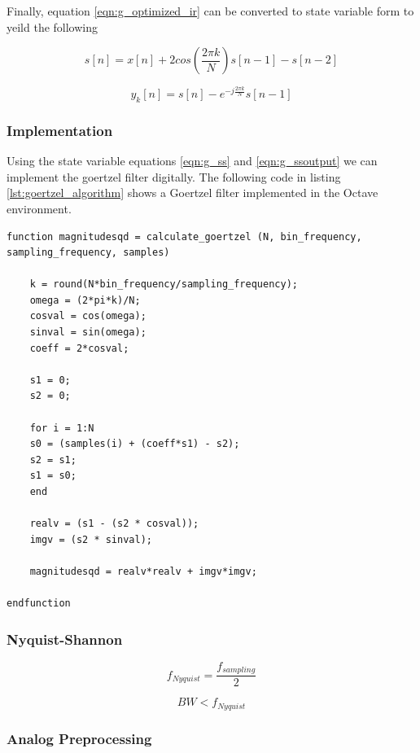 Finally, equation \ref{eqn:g_optimized_ir} can be converted to state variable form to yeild the following


\begin{equation}
	\label{eqn:g_ss}
	s[n] = x[n]+2cos(\frac{2\pi k}{N})s[n-1]-s[n-2]
\end{equation}


\begin{equation}
	\label{eqn:g_ssoutput}
	y_k[n] = s[n]-e^{-j\frac{2\pi k}{N}}s[n-1]
\end{equation}



\subsubsection{Implementation}
\label{sec:goertzel_implementation}
Using the state variable equations \ref{eqn:g_ss} and \ref{eqn:g_ssoutput} we can implement the goertzel filter digitally. The following code in listing \ref{lst:goertzel_algorithm} shows a Goertzel filter implemented in the Octave environment.

\begin{lstlisting}[caption={Goertzel Algorithm - Octave Implementation\label{lst:goertzel_algorithm}}]
function magnitudesqd = calculate_goertzel (N, bin_frequency, sampling_frequency, samples)

	k = round(N*bin_frequency/sampling_frequency);
	omega = (2*pi*k)/N;
	cosval = cos(omega);
	sinval = sin(omega);
	coeff = 2*cosval;
	
	s1 = 0;
	s2 = 0;
	
	for i = 1:N
	s0 = (samples(i) + (coeff*s1) - s2);
	s2 = s1;
	s1 = s0;    
	end
	
	realv = (s1 - (s2 * cosval));
	imgv = (s2 * sinval);  
	
	magnitudesqd = realv*realv + imgv*imgv;

endfunction
\end{lstlisting}

\subsubsection{Nyquist-Shannon}

\[f_{Nyquist} = \frac{f_{sampling}}{2}\]

\begin{equation}
\label{eqn:sampling_frequency}
BW < f_{Nyquist}
\end{equation}


\subsubsection{Analog Preprocessing} %

